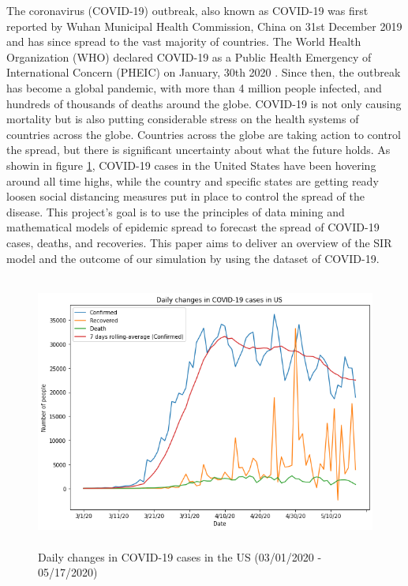 \documentclass[11pt]{article}
\begin{document}
The coronavirus (COVID-19) outbreak, also known as COVID-19 was first reported by Wuhan Municipal Health Commission, China on 31st December 2019 and has since spread to the vast majority of countries. The World Health Organization (WHO) declared COVID-19 as a Public Health Emergency of International Concern (PHEIC) on January, 30th 2020 \cite{who-website}. Since then, the outbreak has become a global pandemic, with more than 4 million people infected, and hundreds of thousands of deaths around the globe. COVID-19 is not only causing mortality but is also putting considerable stress on the health systems of countries across the globe. Countries across the globe are taking action to control the spread, but there is significant uncertainty about what the future holds. As showin in figure \ref{fig:covid-cases-daily-changes-us}, COVID-19 cases in the United States have been hovering around all time highs, while the country and specific states are getting ready loosen social distancing measures put in place to control the spread of the disease. This project's goal is to use the principles of data mining and mathematical models of epidemic spread to forecast the spread of COVID-19 cases, deaths, and recoveries. This paper aims to deliver an overview of the SIR model and the outcome of our simulation by using the dataset of COVID-19.

\begin{figure}[h]
\includegraphics[width=14cm, height=9cm]{images/daily-numbers.png}
\centering
\caption{Daily changes in COVID-19 cases in the US (03/01/2020 - 05/17/2020)}
\label{fig:covid-cases-daily-changes-us}
\end{figure}

\end{document}

